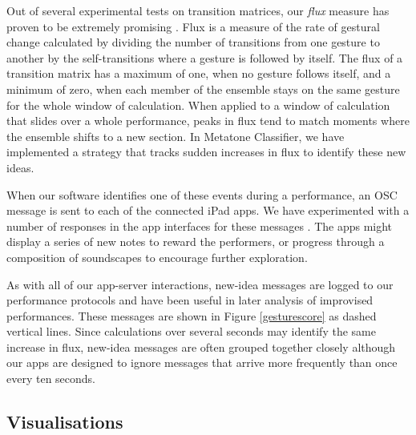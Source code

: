 \documentclass[graybox]{svmult}
\begin{document}
Out of several experimental tests on transition matrices, our
\emph{flux} measure has proven to be extremely promising
\citep{Martin:2015jk}. Flux is a measure of the rate of gestural
change calculated by dividing the number of transitions from one
gesture to another by the self-transitions where a gesture is followed
by itself. The flux of a transition matrix has a maximum of one, when
no gesture follows itself, and a minimum of zero, when each member of
the ensemble stays on the same gesture for the whole window of
calculation. When applied to a window of calculation that slides over
a whole performance, peaks in flux tend to match moments where the
ensemble shifts to a new section. In Metatone Classifier, we have
implemented a strategy that tracks sudden increases in flux to
identify these new ideas.

When our software identifies one of these events during a performance,
an OSC message is sent to each of the connected iPad apps. We have
experimented with a number of responses in the app interfaces for
these messages \citep{Martin:2015jk}. The apps might display a series
of new notes to reward the performers, or progress through a
composition of soundscapes to encourage further exploration.

As with all of our app-server interactions, new-idea messages are
logged to our performance protocols and have been useful in later
analysis of improvised performances. These messages are shown in
Figure \ref{gesturescore} as dashed vertical lines. Since calculations
over several seconds may identify the same increase in flux, new-idea
messages are often grouped together closely although our apps are
designed to ignore messages that arrive more frequently than once
every ten seconds. 

\subsection{Visualisations}
\label{subsec:visualisations}
\end{document}
